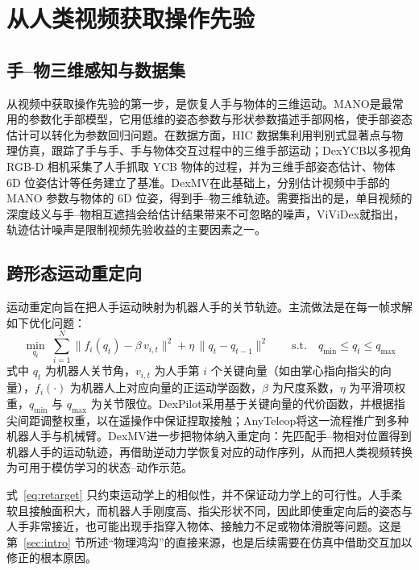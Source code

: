 \documentclass[UTF8,a4paper,zihao=-4]{ctexart}
\begin{document}
\section{从人类视频获取操作先验}\label{sec:prior}

\subsection{手–物三维感知与数据集}

从视频中获取操作先验的第一步，是恢复人手与物体的三维运动。MANO\cite{mano}是最常用的参数化手部模型，它用低维的姿态参数与形状参数描述手部网格，使手部姿态估计可以转化为参数回归问题。在数据方面，HIC 数据集\cite{hic}利用判别式显著点与物理仿真，跟踪了手与手、手与物体交互过程中的三维手部运动；DexYCB\cite{dexycb}以多视角 RGB-D 相机采集了人手抓取 YCB 物体的过程，并为三维手部姿态估计、物体 6D 位姿估计等任务建立了基准。DexMV\cite{dexmv}在此基础上，分别估计视频中手部的 MANO 参数与物体的 6D 位姿，得到手–物三维轨迹。需要指出的是，单目视频的深度歧义与手–物相互遮挡会给估计结果带来不可忽略的噪声，ViViDex\cite{vividex}就指出，轨迹估计噪声是限制视频先验收益的主要因素之一。

\subsection{跨形态运动重定向}

运动重定向旨在把人手运动映射为机器人手的关节轨迹。主流做法是在每一帧求解如下优化问题：
\begin{equation}\label{eq:retarget}
  \min_{q_{t}}\;\sum_{i=1}^{N}\big\|f_{i}(q_{t})-\beta\,v_{i,t}\big\|^{2}+\eta\,\|q_{t}-q_{t-1}\|^{2}
  \qquad\mathrm{s.t.}\quad q_{\min}\le q_{t}\le q_{\max}
\end{equation}
式中 $q_t$ 为机器人关节角，$v_{i,t}$ 为人手第 $i$ 个关键向量（如由掌心指向指尖的向量），$f_i(\cdot)$ 为机器人上对应向量的正运动学函数，$\beta$ 为尺度系数，$\eta$ 为平滑项权重，$q_{\min}$ 与 $q_{\max}$ 为关节限位。DexPilot\cite{dexpilot}采用基于关键向量的代价函数，并根据指尖间距调整权重，以在遥操作中保证捏取接触；AnyTeleop\cite{anyteleop}将这一流程推广到多种机器人手与机械臂。DexMV\cite{dexmv}进一步把物体纳入重定向：先匹配手–物相对位置得到机器人手的运动轨迹，再借助逆动力学恢复对应的动作序列，从而把人类视频转换为可用于模仿学习的状态–动作示范。

式~\eqref{eq:retarget} 只约束运动学上的相似性，并不保证动力学上的可行性。人手柔软且接触面积大，而机器人手刚度高、指尖形状不同，因此即使重定向后的姿态与人手非常接近，也可能出现手指穿入物体、接触力不足或物体滑脱等问题。这是第~\ref{sec:intro} 节所述“物理鸿沟”的直接来源，也是后续需要在仿真中借助交互加以修正的根本原因。
\end{document}
